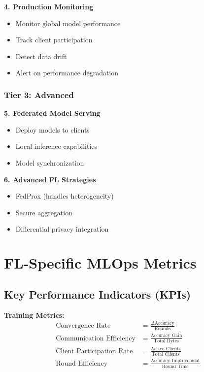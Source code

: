 \documentclass[12pt]{article}
\begin{document}
\textbf{4. Production Monitoring}
\begin{itemize}
    \item Monitor global model performance
    \item Track client participation
    \item Detect data drift
    \item Alert on performance degradation
\end{itemize}

\subsubsection{Tier 3: Advanced}

\textbf{5. Federated Model Serving}
\begin{itemize}
    \item Deploy models to clients
    \item Local inference capabilities
    \item Model synchronization
\end{itemize}

\textbf{6. Advanced FL Strategies}
\begin{itemize}
    \item FedProx (handles heterogeneity)
    \item Secure aggregation
    \item Differential privacy integration
\end{itemize}

\section{FL-Specific MLOps Metrics}

\subsection{Key Performance Indicators (KPIs)}

\textbf{Training Metrics:}
\[
\begin{aligned}
\text{Convergence Rate} &= \frac{\Delta \text{Accuracy}}{\text{Rounds}} \\
\text{Communication Efficiency} &= \frac{\text{Accuracy Gain}}{\text{Total Bytes}} \\
\text{Client Participation Rate} &= \frac{\text{Active Clients}}{\text{Total Clients}} \\
\text{Round Efficiency} &= \frac{\text{Accuracy Improvement}}{\text{Round Time}}
\end{aligned}
\]
\end{document}

